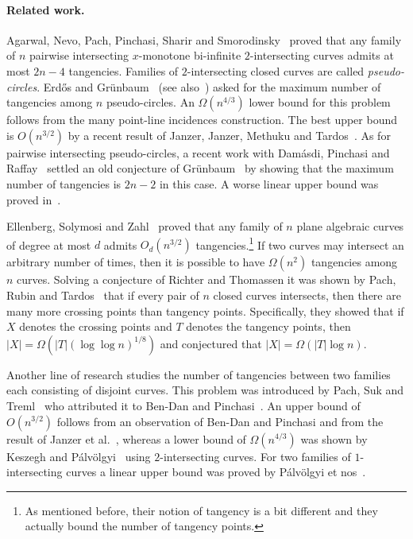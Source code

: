 \documentclass[11pt]{article}
\theoremstyle{definition}
\begin{document}
\paragraph{Related work.}
Agarwal, Nevo, Pach, Pinchasi, Sharir and Smorodinsky~\cite{lenses} proved that
any family of $n$ pairwise intersecting $x$-monotone bi-infinite $2$-intersecting  curves admits at most $2n-4$ tangencies.
Families of $2$-intersecting closed curves are called \emph{pseudo-circles}.
Erd\H{o}s and Gr\"unbaum~\cite{EG73} (see also~\cite[, Problem 14]{BMP05}) asked for the maximum number of tangencies among $n$ pseudo-circles.
An $\Omega(n^{4/3})$ lower bound for this problem follows  from the many point-line incidences construction.
The best upper bound is $O(n^{3/2})$ by a recent result of Janzer, Janzer, Methuku and Tardos~\cite{janzer2025}.
As for pairwise intersecting pseudo-circles, a recent work with Dam\'{a}sdi, Pinchasi and Raffay~\cite{psuedocircles-socg} settled an old conjecture of Gr\"unbaum~\cite{GRUNB72} by showing that the maximum number of tangencies is $2n-2$ in this case. 
A worse linear upper bound was proved in~\cite{lenses}.

Ellenberg, Solymosi and Zahl~\cite{Ellenberg2016New} proved that any family of $n$ plane algebraic curves of degree at most $d$ admits $O_d(n^{3/2})$ tangencies.\footnote{As mentioned before, their notion of tangency is a bit different and they actually bound the number of tangency points.}
If two curves may intersect an arbitrary number of times, then it is possible to have $\Omega(n^2)$ tangencies among $n$ curves.
Solving a conjecture of Richter and Thomassen it was shown by Pach, Rubin and Tardos~\cite{PRT18} that if every pair of $n$ closed curves intersects, then there are many more crossing points than tangency points.
Specifically, they showed that if $X$ denotes the crossing points and $T$ denotes the tangency points, then $|X| = \Omega(|T|(\log \log n)^{1/8})$ and conjectured that $|X| = \Omega(|T|\log n)$.

Another line of research studies the number of tangencies between two families each consisting of disjoint curves.
This problem was introduced by Pach, Suk and Treml~\cite{Treml} who attributed it to Ben-Dan and Pinchasi~\cite{Ben-Dan}.
An upper bound of $O(n^{3/2})$ follows from an observation of Ben-Dan and Pinchasi and from the result of Janzer et al.~\cite{janzer2025}, whereas a lower bound of $\Omega{(n^{4/3})}$ was shown by Keszegh and P{\'a}lv{\"o}lgyi~\cite{KP23} using $2$-intersecting curves.
For two families of $1$-intersecting curves a linear upper bound was proved by P{\'a}lv{\"o}lgyi et nos~\cite{Lshapes}.
\end{document}
